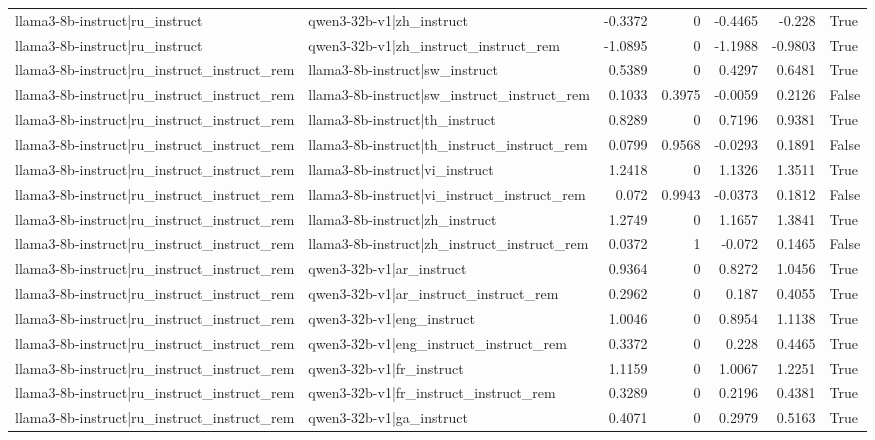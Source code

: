 \begin{table}
\begin{tabular}{l l r r r r l}
llama3-8b-instruct|ru_instruct & qwen3-32b-v1|zh_instruct & -0.3372 & 0 & -0.4465 & -0.228 & True \\
llama3-8b-instruct|ru_instruct & qwen3-32b-v1|zh_instruct_instruct_rem & -1.0895 & 0 & -1.1988 & -0.9803 & True \\
llama3-8b-instruct|ru_instruct_instruct_rem & llama3-8b-instruct|sw_instruct & 0.5389 & 0 & 0.4297 & 0.6481 & True \\
llama3-8b-instruct|ru_instruct_instruct_rem & llama3-8b-instruct|sw_instruct_instruct_rem & 0.1033 & 0.3975 & -0.0059 & 0.2126 & False \\
llama3-8b-instruct|ru_instruct_instruct_rem & llama3-8b-instruct|th_instruct & 0.8289 & 0 & 0.7196 & 0.9381 & True \\
llama3-8b-instruct|ru_instruct_instruct_rem & llama3-8b-instruct|th_instruct_instruct_rem & 0.0799 & 0.9568 & -0.0293 & 0.1891 & False \\
llama3-8b-instruct|ru_instruct_instruct_rem & llama3-8b-instruct|vi_instruct & 1.2418 & 0 & 1.1326 & 1.3511 & True \\
llama3-8b-instruct|ru_instruct_instruct_rem & llama3-8b-instruct|vi_instruct_instruct_rem & 0.072 & 0.9943 & -0.0373 & 0.1812 & False \\
llama3-8b-instruct|ru_instruct_instruct_rem & llama3-8b-instruct|zh_instruct & 1.2749 & 0 & 1.1657 & 1.3841 & True \\
llama3-8b-instruct|ru_instruct_instruct_rem & llama3-8b-instruct|zh_instruct_instruct_rem & 0.0372 & 1 & -0.072 & 0.1465 & False \\
llama3-8b-instruct|ru_instruct_instruct_rem & qwen3-32b-v1|ar_instruct & 0.9364 & 0 & 0.8272 & 1.0456 & True \\
llama3-8b-instruct|ru_instruct_instruct_rem & qwen3-32b-v1|ar_instruct_instruct_rem & 0.2962 & 0 & 0.187 & 0.4055 & True \\
llama3-8b-instruct|ru_instruct_instruct_rem & qwen3-32b-v1|eng_instruct & 1.0046 & 0 & 0.8954 & 1.1138 & True \\
llama3-8b-instruct|ru_instruct_instruct_rem & qwen3-32b-v1|eng_instruct_instruct_rem & 0.3372 & 0 & 0.228 & 0.4465 & True \\
llama3-8b-instruct|ru_instruct_instruct_rem & qwen3-32b-v1|fr_instruct & 1.1159 & 0 & 1.0067 & 1.2251 & True \\
llama3-8b-instruct|ru_instruct_instruct_rem & qwen3-32b-v1|fr_instruct_instruct_rem & 0.3289 & 0 & 0.2196 & 0.4381 & True \\
llama3-8b-instruct|ru_instruct_instruct_rem & qwen3-32b-v1|ga_instruct & 0.4071 & 0 & 0.2979 & 0.5163 & True \\

\end{tabular}
\end{table}

